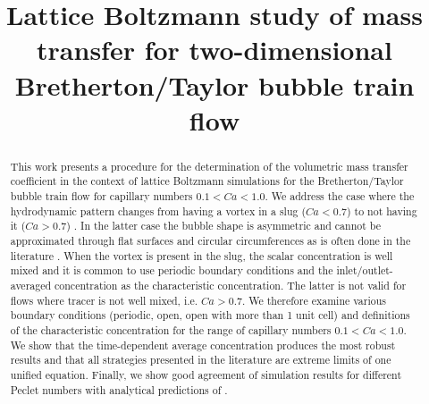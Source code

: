 \documentclass{article}
\title{Lattice Boltzmann study of mass transfer for two-dimensional Bretherton/Taylor bubble train flow}
\begin{document}
\maketitle
\begin{abstract}
This work presents a procedure for the determination of the volumetric mass transfer
coefficient in the context of lattice Boltzmann simulations for the Bretherton/Taylor bubble train
flow for capillary numbers $0.1 < Ca < 1.0$. We address the case where the hydrodynamic pattern changes from having a
vortex in a slug ($Ca<0.7$) to not having it ($Ca>0.7$) \cite{giavedoni-numerical}.  In the latter case
the bubble shape is asymmetric and cannot be approximated through flat surfaces and circular circumferences as
is often done in the literature \cite{vanbaten-circular,kreutzer-overview}.  When the vortex is present
in the slug, the scalar concentration is well mixed and it is common to use periodic boundary conditions and the inlet/outlet-averaged concentration
as the characteristic concentration. %
The latter is not valid for flows where tracer is not well mixed, i.e. $Ca>0.7$.  We therefore
examine various boundary conditions (periodic, open, open with more than 1 unit cell) and definitions of the characteristic concentration for the range of capillary numbers $0.1<Ca<1.0$.
We show that the time-dependent average concentration produces the most robust results and
that all strategies presented in the literature are extreme limits of one unified equation. %
Finally, we show good agreement of simulation results for different Peclet numbers
with analytical predictions of \citet{vanbaten-circular}. %
\end{abstract}
\end{document}
